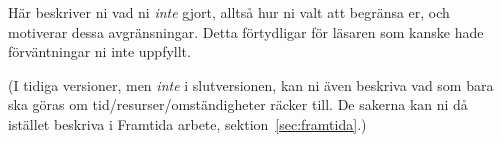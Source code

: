 Här beskriver ni vad ni \emph{inte} gjort, alltså hur ni valt att begränsa er, och motiverar dessa avgränsningar. Detta förtydligar för läsaren som kanske hade för\-vänt\-nin\-gar ni inte uppfyllt.

(I tidiga versioner, men \emph{inte} i slutversionen, kan ni även beskriva vad som bara ska göras om tid/resurser/omständigheter räcker till. De sakerna kan ni då istället beskriva i Framtida arbete, sektion~\ref{sec:framtida}.)


